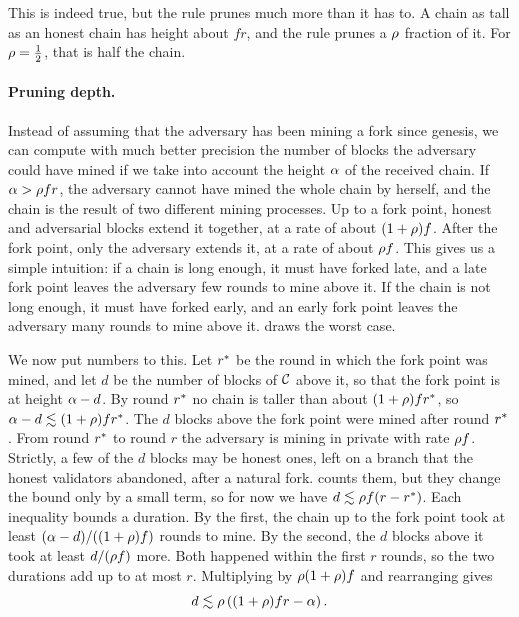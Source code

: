 This is indeed true, but the rule prunes much more than it has to. A chain as
tall as an honest chain has height about $fr$, and the rule prunes a $\rho$
fraction of it. For $\rho=\frac{1}{2}$, that is half the chain.

\paragraph{Pruning depth.}

Instead of assuming that the adversary has been mining a fork since genesis, we
can compute with much better precision the number of blocks the adversary could
have mined if we take into account the height $\alpha$ of the received chain.
If $\alpha>\rho fr$, the adversary cannot have mined the whole chain by herself,
and the chain is the result of two different mining processes.
Up to a fork point, honest and adversarial blocks extend it together, at a rate
of about $(1+\rho)f$. After the fork point, only the adversary extends it, at a
rate of about $\rho f$. This gives us a simple intuition: if a chain is long
enough, it must have forked late, and a late fork point leaves the adversary few
rounds to mine above it. If the chain is not long enough, it must have forked
early, and an early fork point leaves the adversary many rounds to mine above
it.  draws the worst case.

We now put numbers to this. Let $r^{*}$ be the round in which the fork point was
mined, and let $d$ be the number of blocks of $\mathcal{C}$ above it, so that the fork
point is at height $\alpha-d$. By round $r^{*}$ no chain is taller than about
$(1+\rho)fr^{*}$, so $\alpha-d\lesssim(1+\rho)fr^{*}$. The $d$ blocks above the
fork point were mined after round $r^{*}$. From round $r^{*}$ to round $r$ the
adversary is mining in private with rate $\rho f$. Strictly, a few of the $d$
blocks may be honest ones, left on a branch that the honest validators
abandoned, after a natural fork.  counts them, but they change
the bound only by a small term, so for now we have $d\lesssim\rho f(r-r^{*})$.
Each inequality bounds a duration. By the first, the chain up to the fork point
took at least $(\alpha-d)/((1+\rho)f)$ rounds to mine. By the second, the $d$
blocks above it took at least $d/(\rho f)$ more. Both happened within the
first $r$ rounds, so the two durations add up to at most $r$. Multiplying by
$\rho(1+\rho)f$ and rearranging gives
\begin{equation}\label{eq.idealdepth}
    d \lesssim \rho\left((1+\rho)fr-\alpha\right) .
\end{equation}

